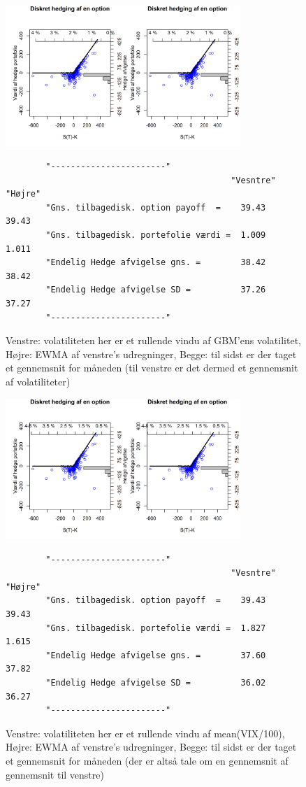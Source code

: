 \documentclass{article}
\theoremstyle{definition}
\theoremstyle{remark}
\begin{document}
\begin{figure}
    \centering
    \includegraphics[width=3.5in]{1 product_call_meanrolling_meanEMVA}
    \caption{Venstre: volatiliteten her er et rullende vindu af GBM'ens volatilitet, Højre: EWMA af venstre's udregninger, Begge: til sidst er der taget et gennemsnit for måneden (til venstre er det dermed et gennemsnit af volatiliteter)}
    \begin{verbatim}
        "-----------------------"                         
                                             "Vesntre"       "Højre"
        "Gns. tilbagedisk. option payoff  =    39.43          39.43
        "Gns. tilbagedisk. portefolie værdi =  1.009          1.011
        "Endelig Hedge afvigelse gns. =        38.42          38.42
        "Endelig Hedge afvigelse SD =          37.26          37.27
        "-----------------------"
    \end{verbatim}
    \label{fig:rullende}
\end{figure}
\begin{figure}
    \centering
    \includegraphics[width=3.5in]{2 product_call_meanrolling_meanEMVA}
    \caption{Venstre: volatiliteten her er et rullende vindu af mean(VIX/100), Højre: EWMA af venstre's udregninger, Begge: til sidst er der taget et gennemsnit for måneden (der er altså tale om en gennemsnit af gennemsnit til venstre)}
    \begin{verbatim}
        "-----------------------"                         
                                             "Vesntre"       "Højre"
        "Gns. tilbagedisk. option payoff  =    39.43          39.43
        "Gns. tilbagedisk. portefolie værdi =  1.827          1.615
        "Endelig Hedge afvigelse gns. =        37.60          37.82
        "Endelig Hedge afvigelse SD =          36.02          36.27
        "-----------------------"
    \end{verbatim}
    \label{fig:rullendeVIX}
\end{figure}
\end{document}
